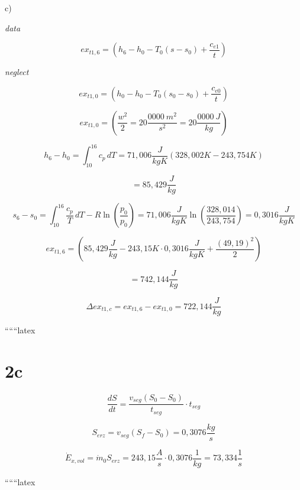 c)

\textit{data}

\[
ex_{t1,6} = \left( h_{6} - h_{0} - T_{0} (s - s_{0}) + \frac{c_{e1}}{t} \right)
\]

\textit{neglect}

\[
ex_{t1,0} = \left( h_{0} - h_{0} - T_{0} (s_{0} - s_{0}) + \frac{c_{e0}}{t} \right)
\]

\[
ex_{t1,0} = \left( \frac{w^2}{2} = 20 \frac{0000 \ m^2}{s^2} = 20 \frac{0000 \ J}{kg} \right)
\]

\[
h_{6} - h_{0} = \int_{10}^{16} c_{p} \, dT = 71,006 \frac{J}{kgK} (328,002 K - 243,754 K)
\]

\[
= 85,429 \frac{J}{kg}
\]

\[
s_{6} - s_{0} = \int_{10}^{16} \frac{c_{p}}{T} \, dT - R \ln \left( \frac{p_{0}}{p_{0}} \right) = 71,006 \frac{J}{kgK} \ln \left( \frac{328,014}{243,754} \right) = 0,3016 \frac{J}{kgK}
\]

\[
ex_{t1,6} = \left( 85,429 \frac{J}{kg} - 243,15 K \cdot 0,3016 \frac{J}{kgK} + \frac{(49,19)^2}{2} \right)
\]

\[
= 742,144 \frac{J}{kg}
\]

\[
\Delta ex_{t1,c} = ex_{t1,6} - ex_{t1,0} = 722,144 \frac{J}{kg}
\]

``````latex



\section*{2c}

\[
\frac{dS}{dt} = \frac{v_{seg}(S_0 - S_0)}{t_{seg}} \cdot t_{seg}
\]

\[
S_{erz} = v_{seg} (S_f - S_0) = 0,3076 \frac{kg}{s}
\]

\[
\dot{E}_{x,vol} = \dot{m}_0 S_{erz} = 243,15 \frac{A}{s} \cdot 0,3076 \frac{1}{kg} = 73,334 \frac{1}{s}
\]

``````latex